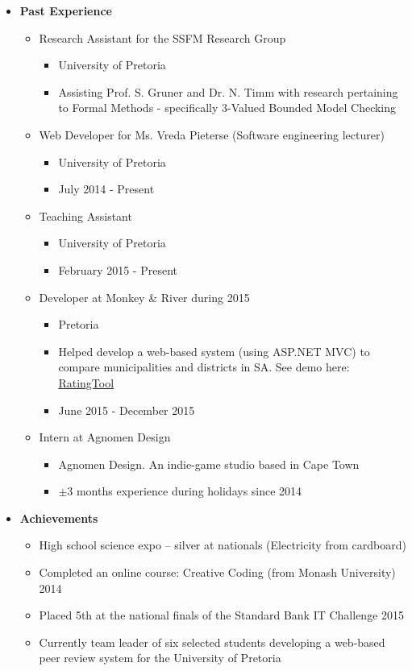 \documentclass{article}
\begin{document}
	\begin{itemize}
		\item \textbf{Past Experience}
		\begin{itemize}
			\item Research Assistant for the SSFM Research Group
			\begin{itemize}
				\item University of Pretoria
				\item Assisting Prof. S. Gruner and Dr. N. Timm with research pertaining to Formal Methods - specifically 3-Valued Bounded Model Checking
			\end{itemize}
			\item Web Developer for Ms. Vreda Pieterse (Software engineering lecturer)
			\begin{itemize}
				\item University of Pretoria
				\item July 2014 - Present
			\end{itemize}
			\item Teaching Assistant
			\begin{itemize}
				\item University of Pretoria
				\item February 2015 - Present
			\end{itemize}
			
			\item Developer at Monkey \& River during 2015
			\begin{itemize}
				\item Pretoria
				\item Helped develop a web-based system (using ASP.NET MVC) to compare municipalities and districts in SA. See demo here: \href{http://salgabarometerdemo.org.za/RatingTool}{RatingTool}
				\item June 2015 - December 2015
			\end{itemize}
			
			\item Intern at Agnomen Design
			\begin{itemize}
				\item Agnomen Design. An indie-game studio based in Cape Town
				\item $ \pm 3 $ months experience during holidays since 2014
			\end{itemize}
		\end{itemize}
		
		\item \textbf{Achievements}
		\begin{itemize}
			\item High school science expo – silver at nationals (Electricity from cardboard)
			\item Completed an online course: Creative Coding (from Monash University) 2014
			\item Placed 5th at the national finals of the Standard Bank IT Challenge 2015
			\item Currently team leader of six selected students developing a web-based peer review system for the University of Pretoria
		\end{itemize}
	\end{itemize}
	
\end{document}
